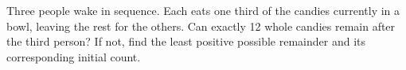 Three people wake in sequence. Each eats one third of the candies currently in a bowl, leaving the rest for the others. Can exactly 12 whole candies remain after the third person? If not, find the least positive possible remainder and its corresponding initial count.
